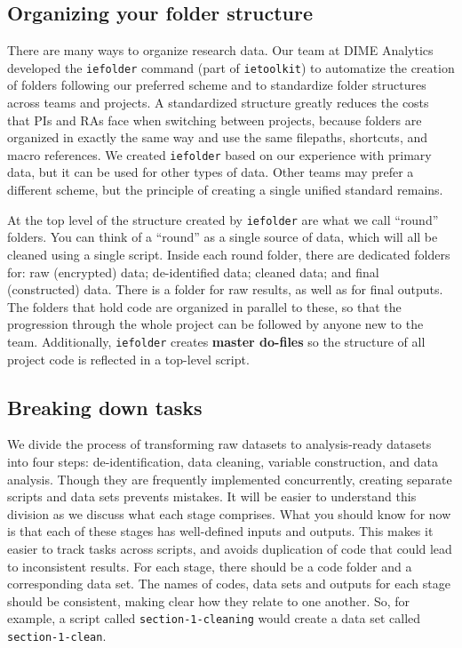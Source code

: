 \subsection{Organizing your folder structure}

There are many ways to organize research data.
Our team at DIME Analytics developed the \texttt{iefolder}
command (part of \texttt{ietoolkit})
to automatize the creation of folders following our preferred scheme and
to standardize folder structures across teams and projects.
A standardized structure greatly reduces the costs that PIs and RAs
face when switching between projects,
because folders are organized in exactly the same way
and use the same filepaths, shortcuts, and macro references.
We created \texttt{iefolder} based on our experience with primary data,
but it can be used for other types of data.
Other teams may prefer a different scheme, but
the principle of creating a single unified standard remains.

At the top level of the structure created by \texttt{iefolder} are what we call ``round'' folders.
You can think of a ``round'' as a single source of data,
which will all be cleaned using a single script.
Inside each round folder, there are dedicated folders for:
raw (encrypted) data; de-identified data; cleaned data; and final (constructed) data.
There is a folder for raw results, as well as for final outputs.
The folders that hold code are organized in parallel to these,
so that the progression through the whole project can be followed by anyone new to the team.
Additionally, \texttt{iefolder} creates \textbf{master do-files}
so the structure of all project code is reflected in a top-level script.

\subsection{Breaking down tasks}

We divide the process of transforming raw datasets to analysis-ready datasets into four steps:
de-identification, data cleaning, variable construction, and data analysis.
Though they are frequently implemented concurrently,
creating separate scripts and data sets prevents mistakes.
It will be easier to understand this division as we discuss what each stage comprises.
What you should know for now is that each of these stages has well-defined inputs and outputs.
This makes it easier to track tasks across scripts,
and avoids duplication of code that could lead to inconsistent results.
For each stage, there should be a code folder and a corresponding data set.
The names of codes, data sets and outputs for each stage should be consistent,
making clear how they relate to one another.
So, for example, a script called \texttt{section-1-cleaning} would create
a data set called \texttt{section-1-clean}.

